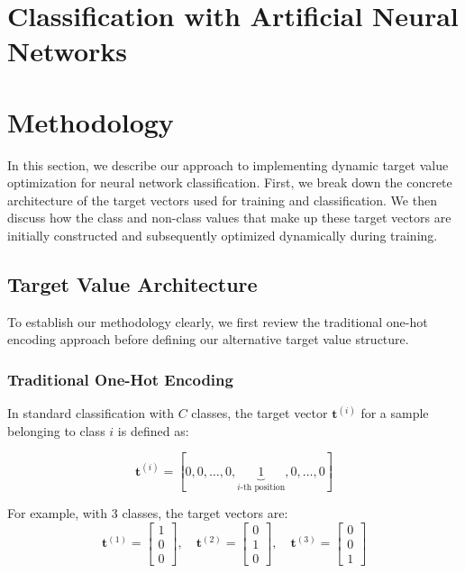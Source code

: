 \documentclass[12pt,fleqn,a4paper]{article}
\begin{document}
\section{Classification with Artificial Neural Networks} %

\section{Methodology}
In this section, we describe our approach to implementing dynamic target value optimization for neural network classification. First, we break down the concrete architecture of the target vectors used for training and classification. We then discuss how the class and non-class values that make up these target vectors are initially constructed and subsequently optimized dynamically during training.

\subsection{Target Value Architecture}

To establish our methodology clearly, we first review the traditional one-hot encoding approach before defining our alternative target value structure.

\subsubsection{Traditional One-Hot Encoding}
In standard classification with $C$ classes, the target vector $\mathbf{t}^{(i)}$ for a sample belonging to class $i$ is defined as:

$$\mathbf{t}^{(i)} = [0, 0, \ldots, 0, \underbrace{1}_{i\text{-th position}}, 0, \ldots, 0]$$

For example, with 3 classes, the target vectors are:
$$\mathbf{t}^{(1)} = \begin{bmatrix} 1 \\ 0 \\ 0 \end{bmatrix}, \quad 
\mathbf{t}^{(2)} = \begin{bmatrix} 0 \\ 1 \\ 0 \end{bmatrix}, \quad 
\mathbf{t}^{(3)} = \begin{bmatrix} 0 \\ 0 \\ 1 \end{bmatrix}$$
\end{document}
